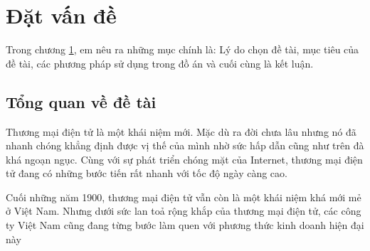 \chapter{Đặt vấn đề}
\label{chapter1}
Trong chương \ref{chapter1}, em nêu ra những mục chính là: Lý do chọn đề tài, mục tiêu của đề tài, các phương pháp sử dụng trong đồ án và cuối cùng là kết luận.
\section{Tổng quan về đề tài}
Thương mại điện tử là một khái niệm mới. Mặc dù ra đời chưa lâu nhưng nó đã nhanh chóng khẳng định được vị thế của mình nhờ sức hấp dẫn cũng như trên đà khá ngoạn ngục. Cùng với sự phát triển chóng mặt của Internet, thương mại điện tử đang có những bước tiến rất nhanh với tốc độ ngày càng cao.
\par
Cuối những năm 1900, thương mại điện tử vẫn còn là một khái niệm khá mới mẻ ở Việt Nam. Nhưng dưới sức lan toả rộng khắp của thương mại điện tử, các công ty Việt Nam cũng đang từng bước làm quen với phương thức kinh doanh hiện đại này 
